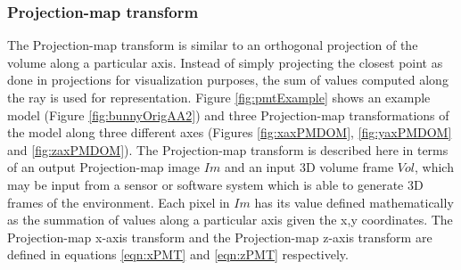 \subsubsection{Projection-map transform}
\label{sec:PMTramsform}

The Projection-map transform is similar to an orthogonal projection of the volume along a particular axis. Instead of simply projecting the closest point as done in projections for visualization purposes, the sum of values computed along the ray is used for representation. Figure \ref{fig:pmtExample} shows an example model (Figure \ref{fig:bunnyOrigAA2}) and three Projection-map transformations of the model along three different axes (Figures \ref{fig:xaxPMDOM}, \ref{fig:yaxPMDOM} and \ref{fig:zaxPMDOM}). The Projection-map transform is described here in terms of an output Projection-map image $Im$ and an input 3D volume frame $Vol$, which may be input from a sensor or software system which is able to generate 3D frames of the environment. Each pixel in $Im$ has its value defined mathematically as the summation of values along a particular axis given the x,y coordinates. The Projection-map x-axis transform and the Projection-map z-axis transform are defined in equations \ref{eqn:xPMT} and \ref{eqn:zPMT} respectively. \\

